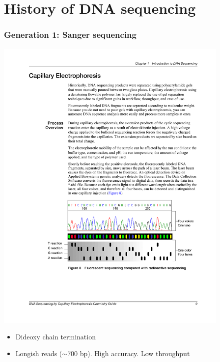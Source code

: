 \documentclass[serif,11pt]{beamer}
\begin{document}
\section{History of DNA sequencing}
\label{sec-2}
\begin{frame}

   \sectionpage
\end{frame}
\begin{frame}
\frametitle{Generation 1: Sanger sequencing}
\label{sec-2-1}

   \includegraphics[width=4.5in]{img/capillary-sanger.pdf}

\begin{itemize}
\item Dideoxy chain termination
\item Longish reads ($\sim700$ bp). High accuracy. Low throughput
\end{itemize}
\end{frame}
\end{document}

